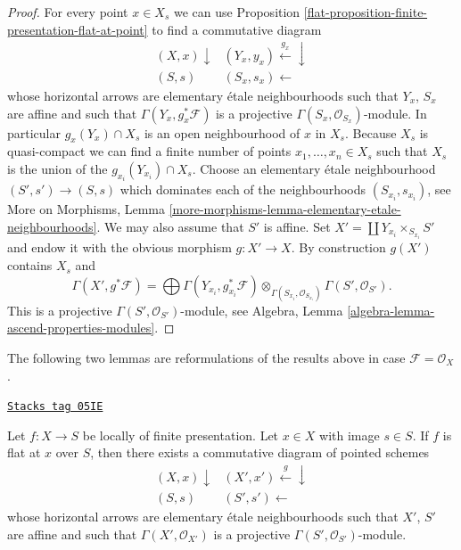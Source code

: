 \begin{proof}

For every point $x \in X_s$ we can use
Proposition \ref{flat-proposition-finite-presentation-flat-at-point}
to find a commutative diagram
$$
\begin{array}{cc}(X, x) \downarrow & (Y_x, y_x) \overset{g_x}{\longleftarrow}\downarrow \\ (S, s) & (S_x, s_x) \longleftarrow\end{array}
$$
whose horizontal arrows are elementary \'etale neighbourhoods
such that $Y_x$, $S_x$ are affine and such that
$\Gamma(Y_x, g_x^*\mathcal{F})$ is a projective
$\Gamma(S_x, \mathcal{O}_{S_x})$-module. In particular
$g_x(Y_x) \cap X_s$ is an open neighbourhood of $x$ in $X_s$.
Because $X_s$ is quasi-compact we can find a finite number of points
$x_1, \ldots, x_n \in X_s$ such that $X_s$ is the union of
the $g_{x_i}(Y_{x_i}) \cap X_s$. Choose an elementary \'etale neighbourhood
$(S' , s') \to (S, s)$ which dominates each of the neighbourhoods
$(S_{x_i}, s_{x_i})$, see
More on Morphisms,
Lemma \ref{more-morphisms-lemma-elementary-etale-neighbourhoods}.
We may also assume that $S'$ is affine.
Set $X' = \coprod Y_{x_i} \times_{S_{x_i}} S'$ and endow it with the
obvious morphism $g : X' \to X$.
By construction $g(X')$ contains $X_s$ and
$$
\Gamma(X', g^*\mathcal{F})
=
\bigoplus \Gamma(Y_{x_i}, g_{x_i}^*\mathcal{F})
\otimes_{\Gamma(S_{x_i}, \mathcal{O}_{S_{x_i}})}
\Gamma(S', \mathcal{O}_{S'}).
$$
This is a projective $\Gamma(S', \mathcal{O}_{S'})$-module, see
Algebra, Lemma \ref{algebra-lemma-ascend-properties-modules}.
\end{proof}

The following two lemmas are reformulations of the results
above in case $\mathcal{F} = \mathcal{O}_X$.

\begin{lemma}
\label{flat-lemma-finite-presentation-flat-at-point-X}
\href{https://stacks.math.columbia.edu/tag/05IE}{\texttt{Stacks tag 05IE}}

Let $f : X \to S$ be locally of finite presentation.
Let $x \in X$ with image $s \in S$.
If $f$ is flat at $x$ over $S$, then there exists a commutative
diagram of pointed schemes
$$
\begin{array}{cc}(X, x) \downarrow & (X', x') \overset{g}{\longleftarrow}\downarrow \\ (S, s) & (S', s') \longleftarrow\end{array}
$$
whose horizontal arrows are elementary \'etale neighbourhoods
such that $X'$, $S'$ are affine and such that
$\Gamma(X', \mathcal{O}_{X'})$ is a projective
$\Gamma(S', \mathcal{O}_{S'})$-module.
\end{lemma}

